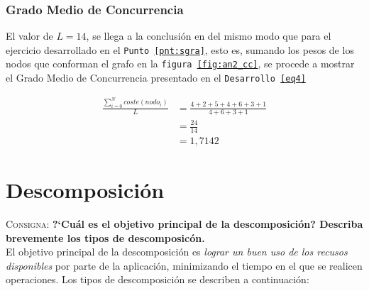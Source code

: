 \documentclass{article}
\begin{document}
\subsubsection{Grado Medio de Concurrencia}
El valor de $L=14$, se llega a la conclusi\'on en del mismo modo que para el
ejercicio desarrollado en el \texttt{Punto \ref{pnt:sgra}}, esto es, sumando
los pesos de los nodos que conforman el grafo en la \texttt{figura
\ref{fig:an2_cc}},
se procede a mostrar el Grado Medio de Concurrencia presentado en el
\texttt{Desarrollo \ref{eq4}}

\begin{equation} \label{eq4}
\begin{split}
\frac{\sum_{i=0}^{N} coste(nodo_{i})}{L} & =  \frac{4 + 2 + 5 + 4 + 6 + 3 +
1}{4 + 6 + 3 + 1} \\
 & = \frac{24}{14} \\
 & = 1,7142
\end{split}
\end{equation}


\section{Descomposici\'on}
\textsc{Consigna}: \textbf{?`Cu\'al es el objetivo principal de la
descomposici\'on? Describa brevemente los tipos de descomposic\'on.}\\

El objetivo principal de la descomposici\'on es \textit{lograr un buen uso de
los recusos disponibles} por parte de la aplicaci\'on, minimizando el tiempo en
el que se realicen operaciones. Los tipos de descomposici\'on se describen a
continuaci\'on:
\end{document}

